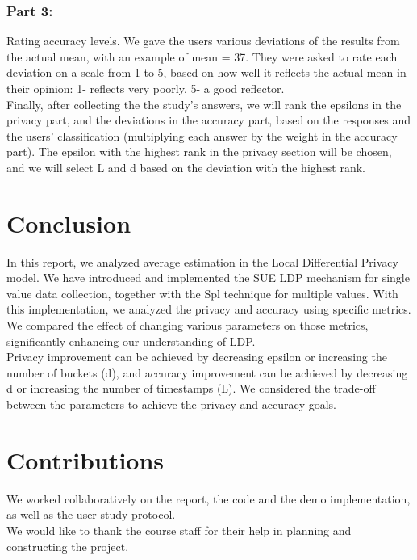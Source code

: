 \documentclass[sigconf]{acmart}
\begin{document}
\subsubsection{Part 3:} Rating accuracy levels. We gave the users various deviations of the results from the actual mean, with an example of mean = 37. They were asked to rate each deviation on a scale from 1 to 5, based on how well it reflects the actual mean in their opinion: 1- reflects very poorly, 5- a good reflector.\\
Finally, after collecting the the study's answers, we will rank the epsilons in the privacy part, and the deviations in the accuracy part, based on the responses and the users' classification (multiplying each answer by the weight in the accuracy part). The epsilon with the highest rank in the privacy section will be chosen, and we will select L and d based on the deviation with the highest rank. 

\section{Conclusion}
In this report, we analyzed average estimation in the Local Differential Privacy model. We have introduced and implemented the SUE LDP mechanism for single value data collection, together with the Spl technique for multiple values. With this implementation, we analyzed the privacy and accuracy using specific metrics.\\ We compared the effect of changing various parameters on those metrics, significantly enhancing our understanding of LDP.\\ Privacy improvement can be achieved by decreasing epsilon or increasing the number of buckets (d), and accuracy improvement can be achieved by decreasing d or increasing the number of timestamps (L). We considered the trade-off between the parameters to achieve the privacy and accuracy goals.

\section{Contributions}
We worked collaboratively on the report, the code and the demo implementation, as well as the user study protocol. \\
We would like to thank the course staff for their help in planning and constructing the project. 




\appendix
\end{document}
